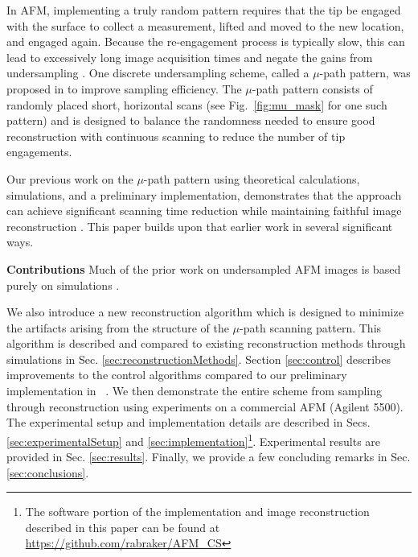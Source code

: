\documentclass[twocolumn,oneside]{IEEEtran/IEEEtran}
\begin{document}
In AFM, implementing a truly random pattern requires that the tip be
engaged with the surface to collect a measurement, lifted and moved to
the new location, and engaged again. Because the re-engagement process
is typically slow, this can lead to excessively long image acquisition
times and negate the gains from undersampling \cite{andersson2012non}.
One discrete undersampling scheme, called a $\mu$-path pattern, was
proposed in \cite{maxwell2014compressed} to improve sampling
efficiency. The $\mu$-path pattern consists of randomly placed short,
horizontal scans (see Fig.~\ref{fig:mu_mask} for one such pattern) and
is designed to balance the randomness needed to ensure good
reconstruction with continuous scanning to reduce the number of tip
engagements. %

Our previous work on the $\mu$-path pattern using theoretical
calculations, simulations, and a preliminary implementation,
demonstrates that the approach can achieve significant scanning time
reduction while maintaining faithful image reconstruction
\cite{maxwell2014compressed,Luo:2015tu, braker_hardware_2018}. This
paper builds upon that earlier work in several significant ways.

\textbf{Contributions} Much of the prior work on undersampled AFM
images is based purely on simulations \cite{han_optimal_2018,
  Luo_nano_2015, oxvig_structure_2017, jensen_reconstruction_2013,
  maxwell_acc_2014, Chen_2012jx}.

We also introduce a new reconstruction algorithm which is designed to
minimize the artifacts arising from the structure of the $\mu$-path
scanning pattern. This algorithm is described and compared to existing
reconstruction methods through simulations in Sec.
\ref{sec:reconstructionMethods}. Section \ref{sec:control} describes
improvements to the control algorithms compared to our preliminary
implementation in ~\cite{braker_hardware_2018}. We then demonstrate
the entire scheme from sampling through reconstruction using
experiments on a commercial AFM (Agilent 5500). The experimental setup
and implementation details are described in Secs.
\ref{sec:experimentalSetup} and \ref{sec:implementation}\footnote{The
  software portion of the implementation and image reconstruction
  described in this paper can be found at
  \url{https://github.com/rabraker/AFM_CS}}. Experimental results are
provided in Sec. \ref{sec:results}. Finally, we provide a few
concluding remarks in Sec. \ref{sec:conclusions}.
\end{document}
